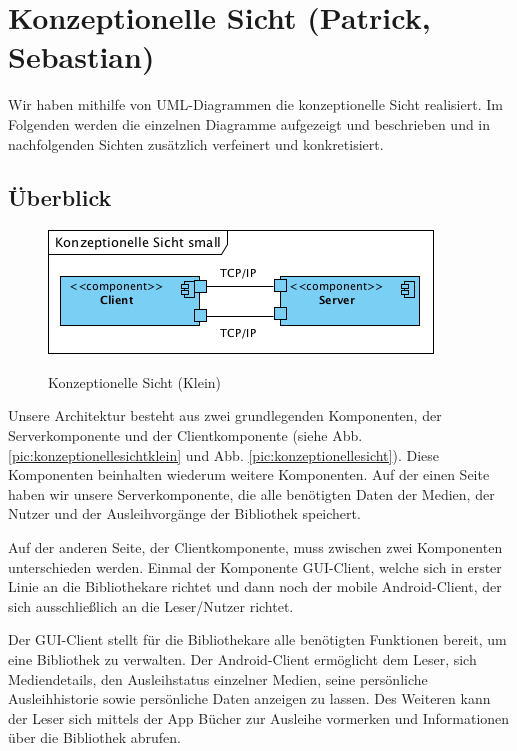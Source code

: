 \documentclass[fontsize=12pt,paper=a4,twoside]{scrartcl}
\begin{document}
\newpage

\section{Konzeptionelle Sicht (Patrick, Sebastian)}
\label{sec:konzeptionell}

Wir haben mithilfe von UML-Diagrammen die konzeptionelle Sicht realisiert. Im Folgenden werden die einzelnen Diagramme aufgezeigt und beschrieben und in nachfolgenden Sichten zusätzlich verfeinert und konkretisiert.

\subsection{Überblick}
\label{Ueberblick}

\begin{figure} [H] 
\caption{Konzeptionelle Sicht (Klein)} \centering
	\includegraphics[scale=2]{Diagramme/KonzeptionelleSichtKlein.png} 
	\label{pic:konzeptionellesichtklein} 
\end{figure}

Unsere Architektur besteht aus zwei grundlegenden Komponenten, der Serverkomponente und der Clientkomponente (siehe Abb. \vref{pic:konzeptionellesichtklein} und Abb. \vref{pic:konzeptionellesicht}). Diese Komponenten beinhalten wiederum weitere Komponenten. Auf der einen Seite haben wir unsere Serverkomponente, die alle benötigten Daten der Medien, der Nutzer und der Ausleihvorgänge der Bibliothek speichert.

Auf der anderen Seite, der Clientkomponente, muss zwischen zwei Komponenten unterschieden werden. Einmal der Komponente GUI-Client, welche sich in erster Linie an die Bibliothekare richtet und dann noch der mobile Android-Client, der sich ausschließlich an die Leser/Nutzer richtet.

Der GUI-Client stellt für die Bibliothekare alle benötigten Funktionen bereit, um eine Bibliothek zu verwalten. Der Android-Client ermöglicht dem Leser, sich Mediendetails, den Ausleihstatus einzelner Medien, seine persönliche Ausleihhistorie sowie persönliche Daten anzeigen zu lassen. Des Weiteren kann der Leser sich mittels der App Bücher zur Ausleihe vormerken und Informationen über die Bibliothek abrufen.
\end{document}
